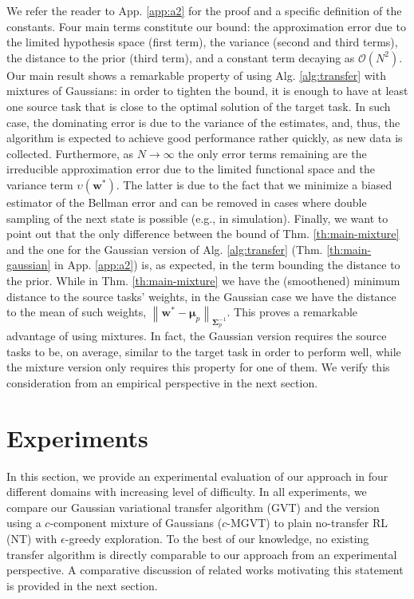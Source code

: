 \documentclass{article}
\newcommand{\norm}[1]{\left\lVert #1 \right\rVert}
\begin{document}
We refer the reader to App. \ref{app:a2} for the proof and a specific definition of the constants. Four main terms constitute our bound: the approximation error due to the limited hypothesis space (first term), the variance (second and third terms), the distance to the prior (third term), and a constant term decaying as $\mathcal{O}(N^2)$. Our main result shows a remarkable property of using Alg. \ref{alg:transfer} with mixtures of Gaussians: in order to tighten the bound, it is enough to have at least one source task that is close to the optimal solution of the target task. In such case, the dominating error is due to the variance of the estimates, and, thus, the algorithm is expected to achieve good performance rather quickly, as new data is collected. Furthermore, as $N\rightarrow\infty$ the only error terms remaining are the irreducible approximation error due to the limited functional space and the  variance term $\upsilon(\bm{w}^*)$. The latter is due to the fact that we minimize a biased estimator of the Bellman error and can be removed in cases where double sampling of the next state is possible (e.g., in simulation). Finally, we want to point out that the only difference between the bound of Thm. \ref{th:main-mixture} and the one for the Gaussian version of Alg. \ref{alg:transfer} (Thm. \ref{th:main-gaussian} in App. \ref{app:a2}) is, as expected, in the term bounding the distance to the prior. While in Thm. \ref{th:main-mixture} we have the (smoothened) minimum distance to the source tasks' weights, in the Gaussian case we have the distance to the mean of such weights, $\norm{\bm{w}^* - \bm{\mu}_p}_{\bm{\Sigma}_p^{-1}}$. This proves a remarkable advantage of using mixtures. In fact, the Gaussian version requires the source tasks to be, on average, similar to the target task in order to perform well, while the mixture version only requires this property for one of them. We verify this consideration from an empirical perspective in the next section.

\section{Experiments} \label{sec:exp}

In this section, we provide an experimental evaluation of our approach in four different domains with increasing level of difficulty. In all experiments, we compare our Gaussian variational transfer algorithm (GVT) and the version using a $c$-component mixture of Gaussians ($c$-MGVT) to plain no-transfer RL (NT) with $\epsilon$-greedy exploration. To the best of our knowledge, no existing transfer algorithm is directly comparable to our approach from an experimental perspective. A comparative discussion of related works motivating this statement is provided in the next section.
\end{document}
